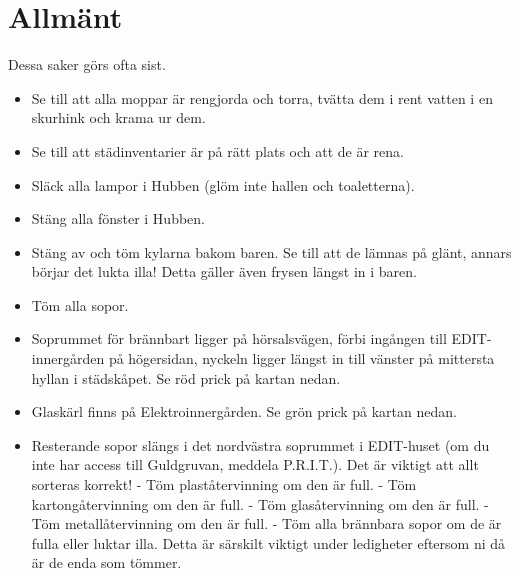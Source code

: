 \section{Allmänt}
Dessa saker görs ofta sist.
\begin{itemize}
    \item Se till att alla moppar är rengjorda och torra, tvätta dem i rent vatten i en skurhink och krama ur dem.
    \item Se till att städinventarier är på rätt plats och att de är rena.
    \item Släck alla lampor i Hubben (glöm inte hallen och toaletterna).
    \item Stäng alla fönster i Hubben.
    \item Stäng av och töm kylarna bakom baren. Se till att de lämnas på glänt, annars börjar det lukta illa! Detta gäller även frysen längst in i baren. 
    \item Töm alla sopor.
    \item Soprummet för brännbart ligger på hörsalsvägen, förbi ingången till EDIT-innergården på högersidan, nyckeln ligger längst in till vänster på mittersta hyllan i städskåpet. Se röd prick på kartan nedan.
    \item Glaskärl finns på Elektroinnergården. Se grön prick på kartan nedan.
    \item Resterande sopor slängs i det nordvästra soprummet i EDIT-huset (om du inte har access till Guldgruvan, meddela P.R.I.T.). Det är viktigt att allt sorteras korrekt! 
    \subitem - Töm plaståtervinning om den är full.
    \subitem - Töm kartongåtervinning om den är full.
    \subitem - Töm glasåtervinning om den är full.
    \subitem - Töm metallåtervinning om den är full.
    \subitem - Töm alla brännbara sopor om de är fulla eller luktar illa. Detta är särskilt viktigt under ledigheter eftersom ni då är de enda som tömmer. 
    
\end{itemize}



